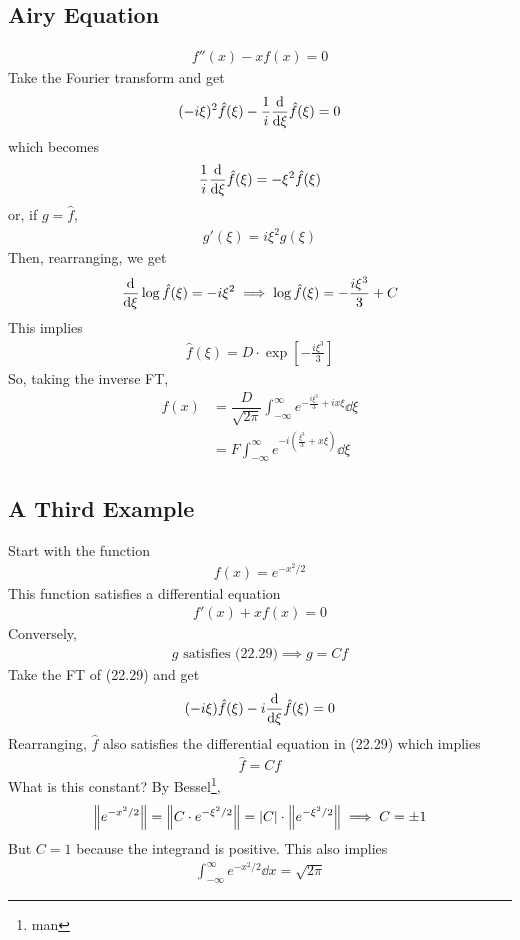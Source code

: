 \subsection{Airy Equation}
\begin{align}
    f''(x) - xf(x) = 0
\end{align}
Take the Fourier transform and get
\begin{align}
    (-i\xi)^2 \hat{f}(\xi) - \dfrac{1}{i}\dv{\xi} \hat{f}(\xi) = 0
\end{align}
which becomes
\begin{align}
    \dfrac{1}{i}\dv{\xi} \hat{f}(\xi) = -\xi^2 \hat{f}(\xi)
\end{align}
or, if $g = \hat{f}$,
\begin{align}
    g'(\xi) = i\xi^2 g(\xi)
\end{align}
Then, rearranging, we get
\begin{align}
    \dv{\xi} \log{\hat{f}(\xi)} = -i\xi^2 \implies \log{\hat{f}(\xi)} = -\dfrac{i\xi^3}{3} + C
\end{align}
This implies
\begin{align}
    \hat{f}(\xi) = D \cdot \exp\left[ -\frac{i\xi^3}{3} \right]
\end{align}
So, taking the inverse FT,
\begin{align}
    f(x) &= \dfrac{D}{\sqrt{2\pi}} \int_{-\infty}^\infty e^{-\frac{i\xi^3}{3} + ix\xi} \dd{\xi}\\
    &= F \int_{-\infty}^\infty e^{-i(\frac{\xi^3}{3} + x\xi)} \dd{\xi}
\end{align}

\subsection{A Third Example}
Start with the function
\begin{align}
    f(x) = e^{-x^2/2}
\end{align}
This function satisfies a differential equation
\begin{align}
    f'(x) + xf(x) = 0
\end{align}
Conversely,
\begin{align}
    g \text{ satisfies (22.29)} \implies g = Cf
\end{align}
Take the FT of (22.29) and get
\begin{align}
    (-i\xi) \hat{f}(\xi) - i \dv{\xi} \hat{f}(\xi) = 0
\end{align}
Rearranging, $\hat{f}$ also satisfies the differential equation in (22.29) which implies
\begin{align}
    \hat{f} = Cf
\end{align}
What is this constant? By Bessel\footnote{man},
\begin{align}
    \norm{e^{-x^2/2}} = \norm{C \cdot e^{-\xi^2/2}} = \abs{C} \cdot \norm{e^{-\xi^2/2}} \implies C = \pm1
\end{align}
But $C = 1$ because the integrand is positive. This also implies
\begin{align}
    \int_{-\infty}^\infty e^{-x^2/2} \dd{x} = \sqrt{2\pi}
\end{align}